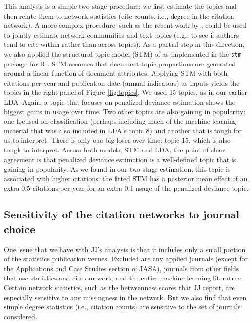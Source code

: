 \documentclass[12pt]{article}
\begin{document}
This analysis is a simple two stage procedure: we first estimate the topics and then relate them to network statistics (cite counts, i.e., degree in the citation network).
A more complex procedure, such as the recent work by \cite{TanChanZheng2015}, could be used to jointly estimate network communities and text topics (e.g., to see if authors tend to cite within rather than across topics).  As a partial step in this direction, we also applied the structural topic model (STM) of \cite{roberts2013structural} as implemented in the {\tt stm} package for R \citep{roberts2014stm}.  STM assumes that document-topic proportions are generated around a linear function of document attributes.  Applying STM with both citations-per-year and publication date (annual indicators) as inputs yields the topics in the right panel of Figure \ref{fig:topics}.  We  used 15 topics, as in our earlier LDA.  Again, a topic that focuses on penalized deviance estimation shows the biggest gains in usage over time.  Two other topics are also gaining in popularity: one focused on classification (perhaps including much of the machine learning material that was also included in LDA's topic 8) and another that is tough for us to interpret.  There is only one big loser over time: topic 15, which is also tough to interpret.  Across both models, STM and LDA, the point of clear agreement is that penalized deviance estimation is a well-defined topic that is gaining in popularity.  As we found in our two stage estimation, this topic is associated with higher citations: the fitted STM has a posterior mean effect of an extra 0.5 citations-per-year for an extra 0.1 usage of the penalized deviance topic.

\subsection*{Sensitivity of the citation networks to journal choice}

One issue that we have with JJ's analysis is that it includes only a small portion of the statistics publication venues.  Excluded are any applied journals (except for the Applications and Case Studies section of JASA), journals from other fields that use statistics and cite our work, and the entire machine learning literature.  Certain network statistics, such as the betweenness scores that JJ report, are especially sensitive to any missingness in the network.  But we also find that even simple degree statistics (i.e., citation counts) are sensitive to the set of journals considered.


\small


\end{document}
